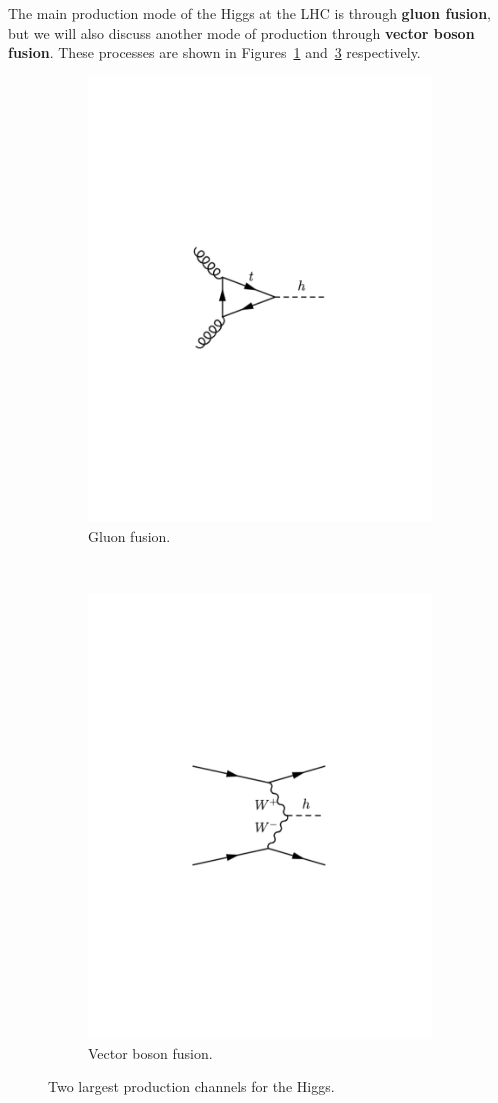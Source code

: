 \documentclass[11pt, oneside]{article}   	%
\theoremstyle{definition}
\numberwithin{equation}{subsection}		%
\begin{document}
The main production mode of the Higgs at the LHC is through \textbf{gluon fusion}, but we will also discuss another mode of production 
through \textbf{vector boson fusion}. These processes are shown in Figures~\ref{subfig:higgs_gluon_fusion} and~\ref{subfig:higgs_vector_fusion} 
respectively.
\begin{figure}[H]
	\centering
	\begin{subfigure}[t]{.4\textwidth}
		\centering
		\includegraphics[width = .5\textwidth]{higgs_glue_fusion}
		\caption{Gluon fusion.}
		\label{subfig:higgs_gluon_fusion}
	\end{subfigure}
	~
	\begin{subfigure}[t]{.4\textwidth}
		\centering
		\includegraphics[width = .5\textwidth]{higgs_vector_fusion}
		\caption{Vector boson fusion.}
		\label{subfig:higgs_vector_fusion}
	\end{subfigure}
	\caption{Two largest production channels for the Higgs.~\cite{schwartz}}
\end{figure}
\end{document}
